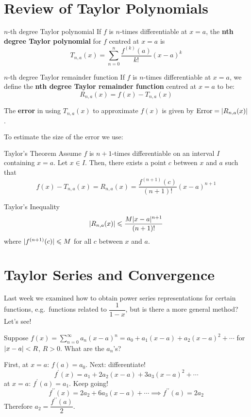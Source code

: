 \setcounter{section}{4}
\section{Review of Taylor Polynomials}
\begin{Definition}{$ n $-th degree Taylor polynomial}{}
    If $ f $ is $ n $-times differentiable at $ x=a $,
    the \textbf{nth degree Taylor polynomial} for $ f $
    centred at $ x=a $ is
    \[ T_{n,a}(x)=\sum\limits_{n=0}^{n} \frac{f^{(k)}(a)}{k!} (x-a)^k \]
\end{Definition}

\begin{Definition}{$ n $-th degree Taylor remainder function}{}
    If $ f $ is $ n $-times differentiable at $ x=a $, we define
    the \textbf{nth degree Taylor remainder function} centred at
    $ x=a $ to be:
    \[ R_{n,a}(x)=f(x)-T_{n,a}(x) \]
\end{Definition}
The \textbf{error} in using $ T_{n,a}(x) $ to approximate
$ f(x) $ is given by $ \text{Error}=\lvert R_{n,a}(x)\rvert $.

To estimate the size of the error we use:
\begin{Theorem}{Taylor's Theorem}{}
    Assume $ f $ is $ n+1 $-times differentiable on an interval
    $ I $ containing $ x=a $. Let $ x\in I $. Then, there exists
    a point $ c $ between $ x $ and $ a $ such that
    \[ f(x)-T_{n,a}(x)=R_{n,a}(x)=
        \frac{f^{(n+1)}(c)}{(n+1)!}(x-a)^{n+1}  \]
\end{Theorem}

\begin{Corollary}{Taylor's Inequality}{}
    \[ \lvert R_{n,a}(x)\rvert\leqslant \frac{M\lvert x-a\rvert^{n+1}}{(n+1)!} \]
    where $ \lvert f^{(n+1)}(c)\rvert\leqslant M $ for all $ c $
    between $ x $ and $ a $.
\end{Corollary}

\setcounter{section}{6}
\section{Taylor Series and Convergence}
Last week we examined how to obtain power series representations
for certain functions, e.g.\ functions related to $ \dfrac{1}{1-x} $,
but is there a more general method? Let's see!

Suppose $ f(x)=\sum\limits_{n=0}^{\infty} a_n(x-a)^n=a_0+a_1(x-a)+a_2(x-a)^2+\cdots $
for $ \lvert x-a\rvert<R $, $ R>0 $. What are the $ a_n $'s?

First, at $ x=a $: $ f(a)=a_0 $. Next: differentiate!
\[ f^\prime(x)=a_1+2a_2(x-a)+3a_3(x-a)^2+\cdots \]
at $ x=a $: $ f^\prime(a)=a_1 $. Keep going!
\[ f^{\prime\prime}(x)=2a_2+6a_3(x-a)+\cdots\implies f^{\prime\prime}(a)=2a_2 \]
Therefore $ a_2=\dfrac{f^{\prime\prime}(a)}{2} $.


